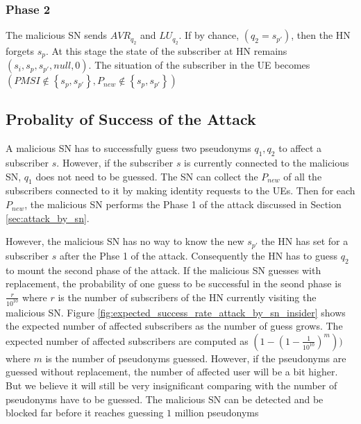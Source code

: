 \documentclass{llncs} %
\begin{document}
\subsubsection{Phase 2} The malicious SN sends $AVR_{q_2}$ and $LU_{q_2}$. If by chance, $\left(q_2 = s_{p'} \right)$, then the HN forgets $s_p$. At this stage the state of the subscriber at HN remains $(s_i,s_p,s_{p'},null,0)$. The situation of the subscriber in the UE becomes $\left(PMSI \notin \left\lbrace s_p,s_{p'} \right\rbrace, P_{new} \notin \left\lbrace s_p, s_{p'}  \right\rbrace \right)$

\subsection{Probality of Success of the Attack}
A malicious SN has to successfully guess two pseudonyms $q_1,q_2$ to affect a subscriber $s$. However, if the subscriber $s$ is currently connected to the malicious SN, $q_1$ does not need to be guessed. The SN can collect the $P_{new}$ of all the subscribers connected to it by making identity requests to the UEs. Then for each $P_{new}$, the malicious SN performs the Phase 1 of the attack discussed in Section \ref{sec:attack_by_sn}. 

However, the malicious SN has no way to know the new $s_{p'}$ the HN has set for a subscriber $s$ after the Phse 1 of the attack. Consequently the HN has to guess $q_2$ to mount the second phase of the attack. If the malicious SN guesses with replacement, the probability of one guess to be successful in the seond phase is $\frac{r}{10^10}$ where $r$ is the number of subscribers of the HN currently visiting the malicious SN. Figure \ref{fig:expected_success_rate_attack_by_sn_insider} shows the expected number of affected subscribers as the number of guess grows. The expected number of affected subscribers are computed as $\left(1-\left(1-\frac{1}{10^{10}}\right)^m\right))$ where $m$ is the number of pseudonyms guessed. However, if the pseudonyms are guessed without replacement, the number of affected user will be a bit higher. But we believe it will still be very insignificant comparing with the number of pseudonyms have to be guessed. The malicious SN can be detected and be blocked far before it reaches guessing $1$ million pseudonyms 
\end{document}
